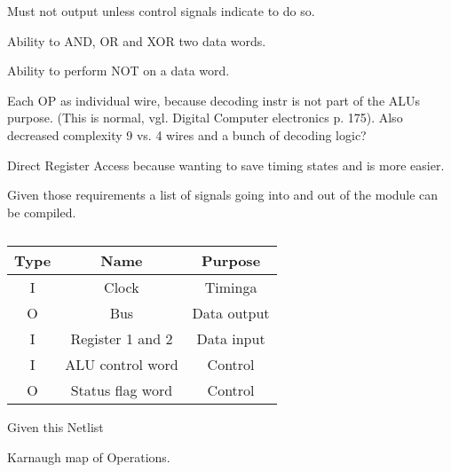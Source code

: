 \begin{feat-requirement}
  Must not output unless control signals indicate to do so. 
\end{feat-requirement}

\begin{feat-requirement}
  Ability to AND, OR and XOR two data words.
\end{feat-requirement}

\begin{feat-requirement}
  Ability to perform NOT on a data word.
\end{feat-requirement}

Each OP as individual wire, because decoding instr is not part of the ALUs purpose. (This is normal, vgl. Digital Computer electronics p. 175). Also decreased complexity 9 vs. 4 wires and a bunch of decoding logic?

Direct Register Access because wanting to save timing states and is more easier. 



Given those requirements a list of signals going into and out of the module can be compiled. 

\begin{table}[]
\begin{tabular}{ccc}
Type& Name & Purpose \\ \hline
I   & Clock & Timinga \\
O   & Bus     & Data output         \\
I   & Register 1 and 2 & Data input \\
I   & ALU control word & Control \\
O   & Status flag word & Control
\end{tabular}
\caption{}
\label{tab:alu-i/o}
\end{table}

Given this Netlist

Karnaugh map of Operations. 


